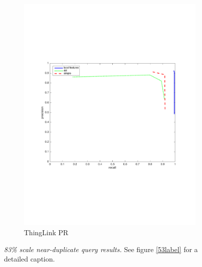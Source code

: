 \documentclass[english,12pt,a4paper,pdftex,elec,utf8, table]{aaltothesis}
\begin{document}
\begin{figure}[htb]
\begin{center}
\begin{subfigure}[b]{0.49\textwidth}
    \includegraphics[width=\textwidth]{figures/thinglink_83scalePR.pdf}
    \caption{ThingLink PR}
    \label{83prthinglink}
  \end{subfigure}
  \caption{\emph{83\% scale near-duplicate query results.} See figure \ref{53label} for a detailed caption. \label{83label}}
  \end{center}
\end{figure}

\clearpage
\end{document}
